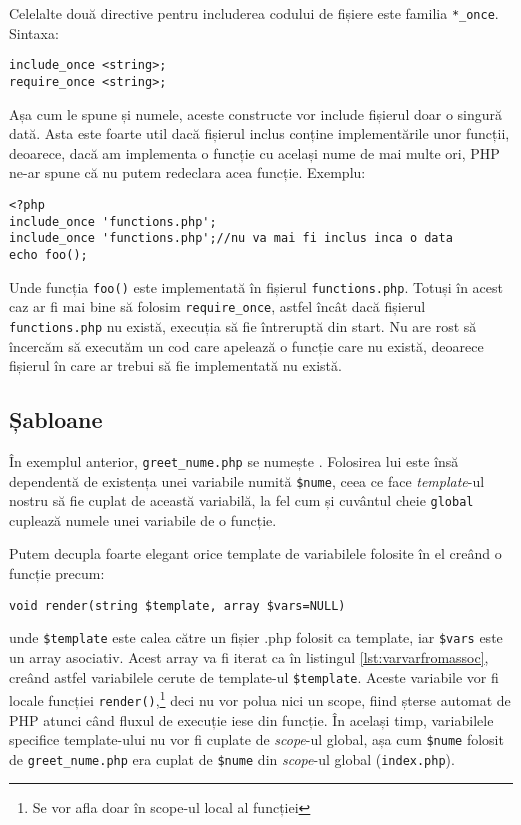 
Celelalte două directive pentru includerea codului de fișiere este familia
\texttt{*\_once}. Sintaxa:
\begin{verbatim}
include_once <string>;
require_once <string>;
\end{verbatim}
Așa cum le spune și numele, aceste constructe vor include fișierul doar o singură
dată. Asta este foarte util dacă fișierul inclus conține implementările unor funcții,
deoarece, dacă am implementa o funcție cu același nume de mai multe ori, PHP
ne-ar spune că nu putem redeclara acea funcție. Exemplu:
\begin{lstlisting}
<?php
include_once 'functions.php';
include_once 'functions.php';//nu va mai fi inclus inca o data
echo foo();
\end{lstlisting}
Unde funcția \texttt{foo()} este implementată în fișierul \texttt{functions.php}.
Totuși în acest caz ar fi mai bine să folosim \texttt{require\_once}, astfel încât dacă
fișierul \texttt{functions.php} nu există, execuția să fie întreruptă din start.
Nu are rost să încercăm să executăm un cod care apelează o funcție care nu există,
deoarece fișierul în care ar trebui să fie implementată nu există.

\subsection{Șabloane}
În exemplul anterior, \texttt{greet\_nume.php} se numește .
Folosirea lui este însă dependentă de existența unei variabile numită \texttt{\$nume},
ceea ce face \textit{template}-ul nostru să fie cuplat de această variabilă, la fel
cum și cuvântul cheie \texttt{global} cuplează numele unei variabile de o funcție.

Putem decupla foarte elegant orice template de variabilele folosite
în el creând o funcție precum:
\begin{verbatim}
void render(string $template, array $vars=NULL)
\end{verbatim}
unde \texttt{\$template} este calea către un fișier .php folosit
ca template, iar \texttt{\$vars} este un array asociativ. Acest array
va fi iterat ca în listingul \ref{lst:varvarfromassoc}, creând astfel
variabilele cerute de template-ul \texttt{\$template}. Aceste variabile
vor fi locale funcției \texttt{render()},\footnote{Se vor afla doar în scope-ul local
al funcției} deci nu vor polua nici un scope, fiind șterse automat de PHP
atunci când fluxul de execuție iese din funcție. În același timp, variabilele
specifice template-ului nu vor fi cuplate de \textit{scope}-ul global, așa cum \texttt{\$nume}
folosit de \texttt{greet\_nume.php} era cuplat de \texttt{\$nume} din \textit{scope}-ul
global (\texttt{index.php}).

